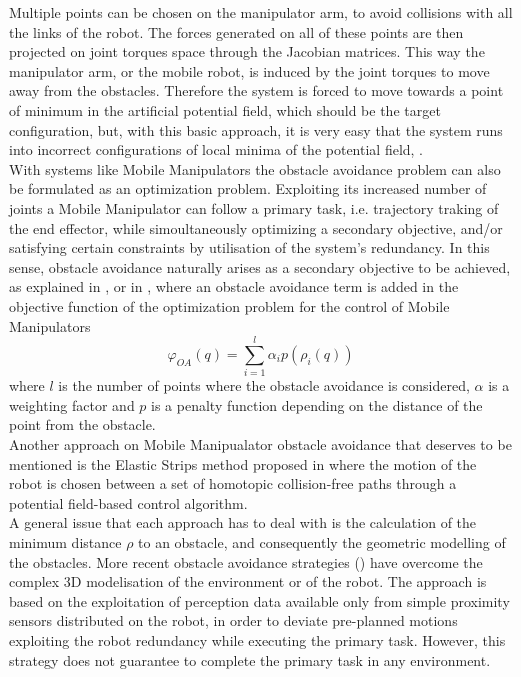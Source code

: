 Multiple points can be chosen on the manipulator arm, to avoid collisions with all the links of the robot. The forces generated on all of these points are then projected on joint torques space through the Jacobian matrices. This way the manipulator arm, or the mobile robot, is induced by the joint torques to move away from the obstacles. Therefore the system is forced to move towards a point of minimum in the artificial potential field, which should be the target configuration, but, with this basic approach, it is very easy that the system runs into incorrect configurations of local minima of the potential field, .\\
With systems like Mobile Manipulators the obstacle avoidance problem can also be formulated as an optimization problem. Exploiting its increased number of joints a Mobile Manipulator can follow a primary task, i.e. trajectory traking of the end effector, while simoultaneously optimizing a secondary objective, and/or satisfying certain constraints by utilisation of the system's redundancy. In this sense, obstacle avoidance naturally arises as a secondary objective to be achieved, as explained in \cite{yamamoto2},\cite{tanner2000} or in \cite{perdereau2002}, where an obstacle avoidance term is added in the objective function of the optimization problem for the control of Mobile Manipulators
\begin{equation}
	\varphi_{OA}(q)=\sum_{i=1}^{l}\alpha_ip(\rho_i(q))
\end{equation}
where $l$ is the number of points where the obstacle avoidance is considered, $\alpha$ is a weighting factor and $p$ is a penalty function depending on the distance of the point from the obstacle.\\
Another approach on Mobile Manipualator obstacle avoidance that deserves to be mentioned is the Elastic Strips method proposed in \cite{brockKhatib} where the motion of the robot is chosen between a set of homotopic collision-free paths through a potential field-based control algorithm. \\
A general issue that each approach has to deal with is the calculation of the minimum distance $\rho$ to an obstacle, and consequently the geometric modelling of the obstacles. More recent obstacle avoidance strategies (\cite{falconatale}) have overcome the complex 3D modelisation of the environment or of the robot. The approach is based on the exploitation of perception data available only from simple proximity sensors distributed on the robot, in order to deviate pre-planned motions exploiting the robot redundancy while executing the primary task. However, this strategy does not guarantee to complete the primary task in any environment.



